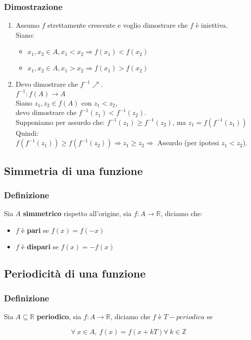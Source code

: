 \subsubsection*{Dimostrazione}
\begin{enumerate}
    \item Assumo $f$ strettamente crescente e voglio dimostrare che $f$ è iniettiva. \\ Siano:
        \begin{itemize}
            \item $x_{1},x_{2} \in A, x_1 < x_{2} \Rightarrow f(x_{1}) < f(x_{2}) $
            \item $x_{1}, x_{2} \in A, x_1 > x_{2} \Rightarrow f(x_{1}) > f(x_{2}) $
        \end{itemize}
    \item Devo dimostrare che $f^{-1} \nearrow$.\\
          $f^{-1}:f(A) \rightarrow A$\\
          Siano $z_{1}, z_{2} \in f(A)$ con $z_{1} < z_{2}$,\\ devo dimostrare che $f^{-1}(z_{1}) < f^{-1}(z_{2})$. \\
          Supponiamo per assurdo che: $f^{-1}(z_{1}) \geq f^{-1}(z_{2})$, ma $z_{1} = f(f^{-1}(z_{1}))$\\
          Quindi:\\
          $f(f^{-1}(z_{1})) \geq f(f^{-1}(z_{2})) \Rightarrow z_{1} \geq z_{2} \Rightarrow$ Assurdo (per ipotesi $z_{1} < z_{2}$).
\end{enumerate}
\subsection{Simmetria di una funzione}
\subsubsection*{Definizione}
Sia $A$ \textbf{simmetrico} rispetto all'origine, sia $f:A \rightarrow \mathbb{R}$, diciamo che:
\begin{itemize}
    \item $f$ è \textbf{pari} se $f(x) = f(-x)$
    \item $f$ è \textbf{dispari} se $f(x) = -f(x)$
\end{itemize}
\subsection{Periodicità di una funzione}
\subsubsection*{Definizione}
Sia $A \subseteq \mathbb{R}$ \textbf{periodico}, sia $f: A \rightarrow \mathbb{R}$, diciamo che $f$ è $T-periodica$ se
\begin{Large}
    \[
        \forall\ x \in A,\ f(x) = f(x+kT) \forall\ k \in \mathbb{Z}    
    \]
\end{Large}